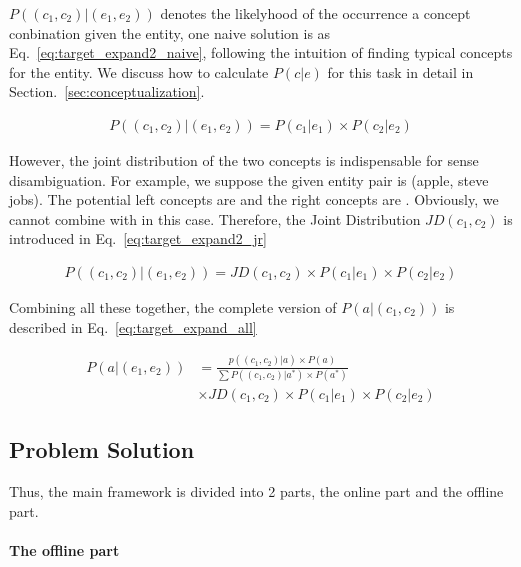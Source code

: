 $P((c_{1},c_{2})|(e_{1},e_{2}))$ denotes the likelyhood of the occurrence a concept conbination given the entity, one naive solution is as Eq.~\ref{eq:target_expand2_naive}, following the intuition of finding typical concepts for the entity. We discuss how to calculate $P(c|e)$ for this task in detail in Section.~\ref{sec:conceptualization}.

\begin{equation}
\label{eq:target_expand2_naive}
\begin{split}
P((c_{1},c_{2})|(e_{1},e_{2})) = P(c_1|e_1) \times P(c_2|e_2)
\end{split}
\end{equation}

However, the joint distribution of the two concepts is indispensable for sense disambiguation. For example, we suppose the given entity pair is (apple, steve jobs). The potential left concepts are  and the right concepts are . Obviously, we cannot combine  with  in this case. Therefore, the Joint Distribution $JD(c_1,c_2)$ is introduced in Eq.~\ref{eq:target_expand2_jr}

\begin{equation}
\label{eq:target_expand2_jr}
\begin{split}
P((c_{1},c_{2})|(e_{1},e_{2})) = JD(c_1,c_2) \times P(c_1|e_1) \times P(c_2|e_2)
\end{split}
\end{equation}


Combining all these together, the complete version of $P(a|(c_{1},c_{2}))$ is described in Eq.~\ref{eq:target_expand_all}

\begin{equation}
\label{eq:target_expand_all}
\begin{split}
 P(a| (e_1,e_2) ) &= \frac{ p((c_{1},c_{2})|a)\times P(a) }{ \sum{P( (c_{1},c_{2})|a^* )\times P(a^*)   } }\\
 &\times JD(c_1,c_2) \times P(c_1|e_1) \times P(c_2|e_2)
\end{split}
\end{equation}



\subsection{Problem Solution}
Thus, the main framework is divided into 2 parts, the online part and the offline part.
\paragraph{The offline part}

